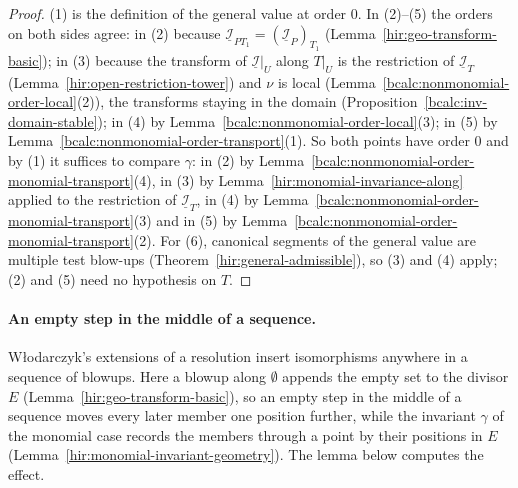 \begin{proof}
\mixedleanok
(1) is the definition of the general value at order \(0\). In (2)--(5) the orders on both sides agree: in (2) because
\(\underline{\mathcal I}_{PT_1}=(\underline{\mathcal I}_P)_{T_1}\) (Lemma~\ref{hir:geo-transform-basic}); in (3) because the transform of \(\underline{\mathcal I}|_U\) along \(T|_U\) is the
restriction of \(\underline{\mathcal I}_T\) (Lemma~\ref{hir:open-restriction-tower}) and \(\nu\) is local (Lemma~\ref{bcalc:nonmonomial-order-local}(2)), the transforms staying
in the domain (Proposition~\ref{bcalc:inv-domain-stable}); in (4) by Lemma~\ref{bcalc:nonmonomial-order-local}(3); in (5) by Lemma~\ref{bcalc:nonmonomial-order-transport}(1).
So both points have order \(0\) and by (1) it suffices to compare \(\gamma\): in (2) by Lemma~\ref{bcalc:nonmonomial-order-monomial-transport}(4), in (3) by
Lemma~\ref{hir:monomial-invariance-along} applied to the restriction of \(\underline{\mathcal I}_T\), in (4) by Lemma~\ref{bcalc:nonmonomial-order-monomial-transport}(3) and
in (5) by Lemma~\ref{bcalc:nonmonomial-order-monomial-transport}(2). For (6), canonical segments of the general value are multiple test blow-ups
(Theorem~\ref{hir:general-admissible}), so (3) and (4) apply; (2) and (5) need no hypothesis on \(T\).
\end{proof}

\paragraph{An empty step in the middle of a sequence.} Włodarczyk's extensions of a resolution insert isomorphisms anywhere in a
sequence of blowups. Here a blowup along \(\emptyset\) appends the empty set to the divisor \(E\) (Lemma~\ref{hir:geo-transform-basic}), so an empty step in the middle of a
sequence moves every later member one position further, while the invariant \(\gamma\) of the monomial case records the members through a point by their
positions in \(E\) (Lemma~\ref{hir:monomial-invariant-geometry}). The lemma below computes the effect.

